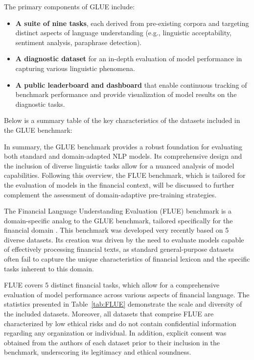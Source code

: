 The primary components of GLUE include:

\begin{itemize}
    \item \textbf{A suite of nine tasks}, each derived from pre-existing corpora and targeting distinct aspects of language
    understanding (e.g., linguistic acceptability, sentiment analysis, paraphrase detection).
    \item \textbf{A diagnostic dataset} for an in-depth evaluation of model performance in capturing various linguistic phenomena.
    \item \textbf{A public leaderboard and dashboard} that enable continuous tracking of benchmark performance and provide
    visualization of model results on the diagnostic tasks.
\end{itemize}

Below is a summary table of the key characteristics of the datasets included in the GLUE benchmark:



In summary, the GLUE benchmark provides a robust foundation for evaluating both standard and domain-adapted NLP models.
Its comprehensive design and the inclusion of diverse linguistic tasks allow for a nuanced analysis of model capabilities.
Following this overview, the FLUE benchmark, which is tailored for the evaluation of models in the financial context,
will be discussed to further complement the assessment of domain-adaptive pre-training strategies.

The Financial Language Understanding Evaluation (FLUE) benchmark is a domain-specific analog to the GLUE benchmark,
tailored specifically for the financial domain \parencite{FLANG2022FLUE}. This benchmark was developed very recently based
on 5 diverse datasets. Its creation was driven by the need to evaluate models capable of effectively processing
financial texts, as standard general-purpose datasets often fail to capture the unique characteristics of financial
lexicon and the specific tasks inherent to this domain.



FLUE covers 5 distinct financial tasks, which allow for a comprehensive evaluation of model performance across various aspects
of financial language. The statistics presented in Table~\ref{tab:FLUE} demonstrate the scale and diversity of the included datasets.
Moreover, all datasets that comprise FLUE are characterized by low ethical risks and do not contain confidential information regarding
any organization or individual. In addition, explicit consent was obtained from the authors of each dataset prior to their inclusion
in the benchmark, underscoring its legitimacy and ethical soundness.

